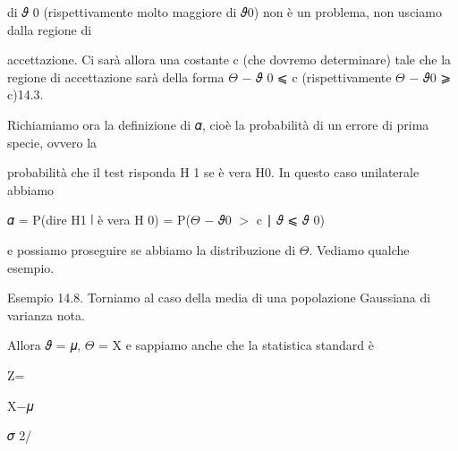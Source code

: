 \documentclass[a4paper,portrait,12pt]{article}
\begin{document}
\begin{flushleft}
di 𝜗 0 (rispettivamente molto maggiore di 𝜗0) non \`{e} un problema, non usciamo dalla regione di
\end{flushleft}


\begin{flushleft}
accettazione. Ci sar\`{a} allora una costante c (che dovremo determinare) tale che la regione di accettazione sar\`{a} della forma $\Theta$ $-$ 𝜗 0 ⩽ c (rispettivamente $\Theta$ $-$ 𝜗0 ⩾ c)14.3.
\end{flushleft}


\begin{flushleft}
Richiamiamo ora la definizione di 𝛼, cio\`{e} la probabilit\`{a} di un errore di prima specie, ovvero la
\end{flushleft}


\begin{flushleft}
probabilit\`{a} che il test risponda H 1 se \`{e} vera H0. In questo caso unilaterale abbiamo
\end{flushleft}


\begin{flushleft}
𝛼 = P(dire H1 ∣ \`{e} vera H 0) = P($\Theta$ $-$ 𝜗0 $>$ c ∣ 𝜗 ⩽ 𝜗 0)
\end{flushleft}


\begin{flushleft}
e possiamo proseguire se abbiamo la distribuzione di $\Theta$. Vediamo qualche esempio.
\end{flushleft}


\begin{flushleft}
Esempio 14.8. Torniamo al caso della media di una popolazione Gaussiana di varianza nota.
\end{flushleft}


\begin{flushleft}
Allora 𝜗 = 𝜇, $\Theta$ = X e sappiamo anche che la statistica standard \`{e}
\end{flushleft}


\begin{flushleft}
Z=
\end{flushleft}





\begin{flushleft}
X$-$𝜇
\end{flushleft}


\begin{flushleft}
𝜎 2/
\end{flushleft}
\end{document}
